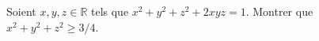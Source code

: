 Soient $x, y, z \in \mathbb{R}$ tels que $x^2 + y^2 + z^2 + 2xyz = 1$. Montrer que $x^2 + y^2 + z^2 \geq 3/4$.
